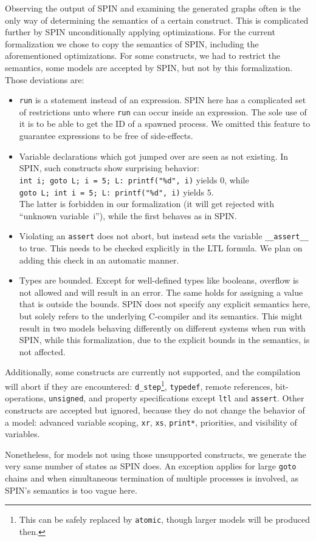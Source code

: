 Observing the output of SPIN and examining the generated graphs often is the only way of determining the semantics of a certain construct. This is complicated further by SPIN unconditionally applying optimizations. For the current formalization we chose to copy the semantics of SPIN, including the aforementioned optimizations. For some constructs, we had to restrict the semantics, \ie some models are accepted by SPIN, but not by this formalization. Those deviations are:
\begin{itemize}
    \item \texttt{run} is a statement instead of an expression. SPIN here has a complicated set of restrictions unto where \texttt{run} can occur inside an expression. The sole use of it is to be able to get the ID of a spawned process. We omitted this feature to guarantee expressions to be free of side-effects.
    \item Variable declarations which got jumped over are seen as not existing. In SPIN, such constructs show surprising behavior:\\\texttt{int~i;~goto~L;~i~=~5;~L:~printf("\%d",~i)} yields $0$, while \\\texttt{goto L; int i = 5; L: printf("\%d", i)} yields $5$.\\
        The latter is forbidden in our formalization (it will get rejected with ``unknown variable~i''), while the first behaves as in SPIN.
    \item Violating an \texttt{assert} does not abort, but instead sets the variable \texttt{\_\_assert\_\_} to true. This needs to be checked explicitly in the LTL formula. We plan on adding this check in an automatic manner.
    \item Types are bounded. Except for well-defined types like booleans, overflow is not allowed and will result in an error. The same holds for assigning a value that is outside the bounds. SPIN does not specify any explicit semantics here, but solely refers to the underlying C-compiler and its semantics. This might result in two models behaving differently on different systems when run with SPIN, while this formalization, due to the explicit bounds in the semantics, is not affected.
\end{itemize}

Additionally, some constructs are currently not supported, and the compilation will abort if they are encountered: \texttt{d\_step}\footnote{This can be safely replaced by \texttt{atomic}, though larger models will be produced then.}, \texttt{typedef}, remote references, bit-operations, \texttt{unsigned}, 
and property specifications except \texttt{ltl} and \texttt{assert}. Other constructs are accepted but ignored, because they do not change the behavior of a model: advanced variable scoping, \texttt{xr}, \texttt{xs}, \texttt{print*}, priorities, and visibility of variables.

Nonetheless, for models not using those unsupported constructs, we generate the very same number of states as SPIN does. An exception applies for large \texttt{goto} chains and when simultaneous termination of multiple processes is involved, as SPIN's semantics is too vague here.
